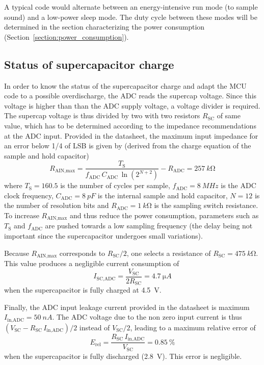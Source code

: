\documentclass{EPL-master-thesis-covers-EN}
\newcommand{\te}[1]{\textrm{#1}}
\begin{document}
A typical code would alternate between an energy-intensive run mode (to sample sound) and a low-power sleep mode. The duty cycle between these modes will be determined in the section characterizing the power consumption (Section~\ref{section:power_consumption}).

\subsection*{Status of supercapacitor charge}

In order to know the status of the supercapacitor charge and adapt the MCU code to a possible overdischarge, the ADC reads the supercap voltage. Since this voltage is higher than than the ADC supply voltage, a voltage divider is required. The supercap voltage is thus divided by two with two resistors $R_\te{SC}$ of same value, which has to be determined according to the impedance recommendations at the ADC input. Provided in the datasheet, the maximum input impedance for an error below 1/4 of LSB is given by (derived from the charge equation of the sample and hold capacitor)
\[
 R_\te{AIN,max} = \frac{T_\te{S}}{f_\te{ADC}\,C_\te{ADC}\,\ln(2^{N+2})} - R_\te{ADC} = \SI{257}{k\ohm}
\]
where $T_\te{S} = 160.5$ is the number of cycles per sample, $f_\te{ADC} = \SI{8}{MHz}$ is the ADC clock frequency, $C_\te{ADC} = \SI{8}{pF}$ is the internal sample and hold capacitor, $N=12$ is the number of resolution bits and $R_\te{ADC} = \SI{1}{k\ohm}$ is the sampling switch resistance. To increase $R_\te{AIN,max}$ and thus reduce the power consumption, parameters such as $T_\te{S}$ and $f_\te{ADC}$ are pushed towards a low sampling frequency (the delay being not important since the supercapacitor undergoes small variations).

Because $R_\te{AIN,max}$ corresponds to $R_\te{SC}/2$, one selects a resistance of $R_\te{SC} = \SI{475}{k\ohm}$. This value produces a negligible current consumption of
\[
 I_\te{SC,ADC} = \frac{V_\te{SC}}{2R_\te{SC}} = \SI{4.7}{\micro A}
\]
when the supercapacitor is fully charged at \SI{4.5}{V}.

Finally, the ADC input leakage current provided in the datasheet is maximum $I_\te{in,ADC} = \SI{50}{nA}$. The ADC voltage due to the non zero input current is thus $(V_\te{SC} - R_\te{SC}\,I_\te{in,ADC})/2$ instead of $V_\te{SC}/2$, leading to a maximum relative error of
\[
 E_\te{rel} = \frac{R_\te{SC}\,I_\te{in,ADC}}{V_\te{SC}} = \SI{0.85}{\%}
\]
when the supercapacitor is fully discharged (\SI{2.8}{V}). This error is negligible.
\end{document}
